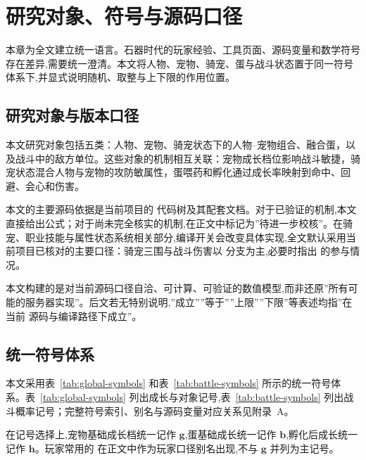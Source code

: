 \chapter{研究对象、符号与源码口径}

本章为全文建立统一语言。石器时代的玩家经验、工具页面、源码变量和数学符号存在差异,需要统一澄清。本文将人物、宠物、骑宠、蛋与战斗状态置于同一符号体系下,并显式说明随机、取整与上下限的作用位置。

\section{研究对象与版本口径}

本文研究对象包括五类：人物、宠物、骑宠状态下的人物--宠物组合、融合蛋，以及战斗中的敌方单位。这些对象的机制相互关联：宠物成长档位影响战斗敏捷，骑宠状态混合人物与宠物的攻防敏属性，蛋喂药和孵化通过成长率映射到命中、回避、会心和伤害。

本文的主要源码依据是当前项目的  代码树及其配套文档。对于已验证的机制,本文直接给出公式；对于尚未完全核实的机制,在正文中标记为”待进一步校核”。在骑宠、职业技能与属性状态系统相关部分,编译开关会改变具体实现,全文默认采用当前项目已核对的主要口径：骑宠三围与战斗伤害以  分支为主,必要时指出  的参与情况。

本文构建的是对当前源码口径自洽、可计算、可验证的数值模型,而非还原”所有可能的服务器实现”。后文若无特别说明,”成立””等于””上限””下限”等表述均指”在当前  源码与编译路径下成立”。

\section{统一符号体系}

本文采用表~\ref{tab:global-symbols} 和表~\ref{tab:battle-symbols} 所示的统一符号体系。表~\ref{tab:global-symbols} 列出成长与对象记号,表~\ref{tab:battle-symbols} 列出战斗概率记号；完整符号索引、别名与源码变量对应关系见附录~A。

在记号选择上,宠物基础成长档统一记作 $\bm{g}$,蛋基础成长统一记作 $\bm{b}$,孵化后成长统一记作 $\bm{h}$。玩家常用的 \vstd{} 在正文中作为玩家口径别名出现,不与 $\bm{g}$ 并列为主记号。

